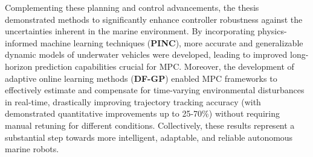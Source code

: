 Complementing these planning and control advancements, the thesis demonstrated methods to significantly enhance controller robustness against the uncertainties inherent in the marine environment. By incorporating physics-informed machine learning techniques (\textbf{PINC}), more accurate and generalizable dynamic models of underwater vehicles were developed, leading to improved long-horizon prediction capabilities crucial for \ac{MPC}. Moreover, the development of adaptive online learning methods (\textbf{DF-GP}) enabled \ac{MPC} frameworks to effectively estimate and compensate for time-varying environmental disturbances in real-time, drastically improving trajectory tracking accuracy (with demonstrated quantitative improvements up to 25-70\%) without requiring manual retuning for different conditions. Collectively, these results represent a substantial step towards more intelligent, adaptable, and reliable autonomous marine robots.